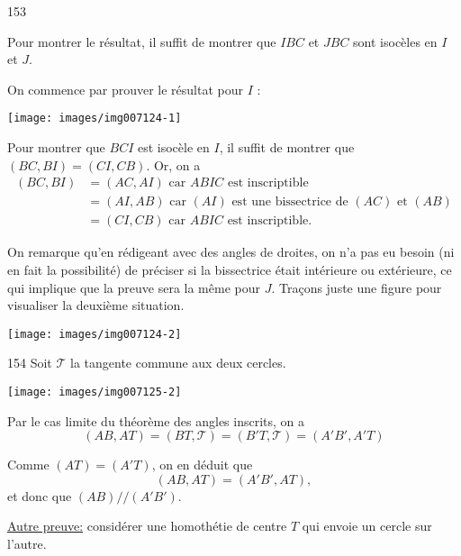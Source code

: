 \begin{Soln}{153}

Pour montrer le résultat, il suffit de montrer que $IBC$ et $JBC$ sont isocèles en $I$ et $J$.

On commence par prouver le résultat pour $I$ :

\begin{center}
\texttt{[image: images/img007124-1]}
\end{center}

Pour montrer que $BCI$ est isocèle en $I$, il suffit de montrer que $(BC,BI) = (CI,CB)$. Or, on a
\begin{align*}
(BC,BI) &= (AC,AI) \text{ car $ABIC$ est inscriptible}\\
&= (AI,AB) \text{ car $(AI)$ est une bissectrice de $(AC)$ et $(AB)$}\\
&= (CI,CB) \text{ car $ABIC$ est inscriptible.}
\end{align*}

On remarque qu'en rédigeant avec des angles de droites, on n'a pas eu besoin (ni en fait la possibilité) de préciser si la bissectrice était intérieure ou extérieure, ce qui implique que la preuve sera la même pour $J$. Traçons juste une figure pour visualiser la deuxième situation.


\begin{center}
\texttt{[image: images/img007124-2]}
\end{center}



\end{Soln}
\begin{Soln}{154}
Soit $\mathcal T$ la tangente commune  aux deux cercles.

\begin{center}
\texttt{[image: images/img007125-2]}
\end{center}

Par le cas limite du théorème des angles inscrits, on a
\[ (AB,AT) = (BT,\mathcal T)=(B'T,\mathcal T)=(A'B',A'T)\]

Comme $(AT) = (A'T)$, on en déduit que
\[ (AB,AT) = (A'B',AT),\]
et donc que $(AB)//(A'B')$.

\underline{Autre preuve:} considérer une homothétie de centre $T$ qui envoie un cercle sur l'autre.

\end{Soln}
